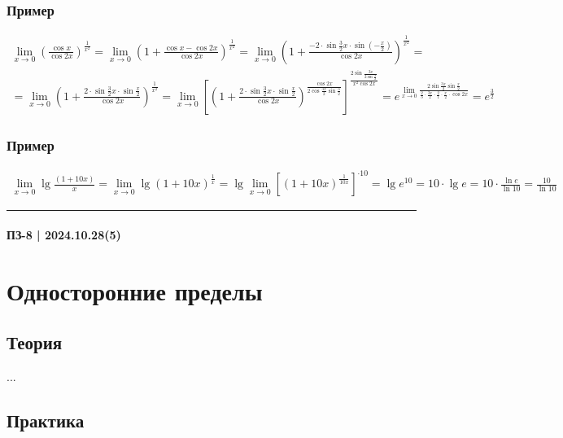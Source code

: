 \documentclass{article}
\begin{document}
\subsubsection{Пример}
\begin{gather*}
    \lim_{x \to 0} \left( \frac{\cos x}{\cos 2x} \right)^{\frac{1}{x^2}} =
    \lim_{x \to 0} \left( 1 + \frac{\cos x - \cos 2x}{\cos 2x} \right)^{\frac{1}{x^2}} = 
    \lim_{x \to 0} \left( 1 + \frac{-2\cdot\sin \frac{3}{2} x\cdot\sin (-\frac{x}{2})}{\cos 2x} \right)^{\frac{1}{x^2}} = \\
    = \lim_{x \to 0} \left( 1 + \frac{2\cdot\sin \frac{3}{2}x\cdot\sin \frac{x}{2}}{\cos 2x} \right)^{\frac{1}{x^2}} =
    \lim_{x \to 0} \left[ \left( 1 + \frac{2\cdot\sin \frac{3}{2}x\cdot\sin \frac{x}{2}}{\cos 2x} \right)^{\frac{\cos 2x}{2 \cos \frac{3x}{2} \sin \frac{3}{2}}} \right]^{\frac{2 \sin \frac{3x}{2 \sin \frac{x}{2}}}{x^2 \cos 2x}} =
    e^{\lim_{x \to 0} \frac{2 \sin \frac{3x}{2} \sin \frac{x}{2}}{\frac{2}{3}\cdot\frac{3x}{2}\cdot\frac{2}{1}\cdot\frac{x}{2}\cdot\cos 2x}} =
    e^{\frac{3}{2}}
\end{gather*}

\subsubsection{Пример}
\begin{gather*}
    \lim_{x \to 0} \lg \frac{(1 + 10x)}{x} =
    \lim_{x \to 0} \lg (1 + 10x)^{\frac{1}{x}} =
    \lg \lim_{x \to 0} \left[ (1 + 10x)^{\frac{1}{10x}} \right]^{\cdot 10} =
    \lg e^{10} = 
    10 \cdot \lg e =
    10 \cdot \frac{\ln e}{\ln 10} =
    \frac{10}{\ln 10}
\end{gather*}



\par\noindent\rule{\textwidth}{1pt}
\paragraph{ПЗ-8 | 2024.10.28(5)}
\section{Односторонние пределы}

\subsection{Теория}
...


\subsection{Практика}
\end{document}
